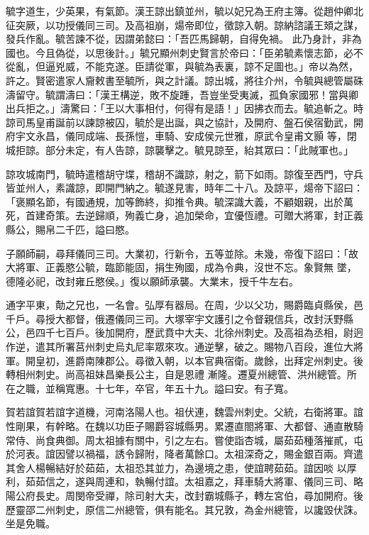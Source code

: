 \begin{pinyinscope}
 毓字道生，少英果，有氣節。漢王諒出鎮並州，毓以妃兄為王府主簿。從趙仲卿北征突厥，以功授儀同三司。及高祖崩，煬帝即位，徵諒入朝。諒納諮議王頍之謀，發兵作亂。毓苦諫不從，因謂弟懿曰：「吾匹馬歸朝，自得免禍。
 此乃身計，非為國也。今且偽從，以思後計。」毓兄顯州刺史賢言於帝曰：「臣弟毓素懷志節，必不從亂，但逼兇威，不能克遂。臣請從軍，與毓為表裏，諒不足圖也。」帝以為然，許之。賢密遣家人齎敕書至毓所，與之計議。諒出城，將往介州，令毓與總管屬硃濤留守。毓謂濤曰：「漢王構逆，敗不旋踵，吾豈坐受夷滅，孤負家國邪！當與卿出兵拒之。」濤驚曰：「王以大事相付，何得有是語！」因拂衣而去。毓追斬之。時諒司馬皇甫誕前以諫諒被囚，毓於是出誕，與之協計，及開府、盤石侯宿勤武，開府宇文永昌，儀同成端、長孫愷，車騎、安成侯元世雅，原武令皇甫文顥
 等，閉城拒諒。部分未定，有人告諒，諒襲擊之。毓見諒至，紿其眾曰：「此賊軍也。」



 諒攻城南門，毓時遣稽胡守堞，稽胡不識諒，射之，箭下如雨。諒復至西門，守兵皆並州人，素識諒，即開門納之。毓遂見害，時年二十八。及諒平，煬帝下詔曰：「褒顯名節，有國通規，加等飾終，抑推令典。毓深識大義，不顧姻親，出於萬死，首建奇策。去逆歸順，殉義亡身，追加榮命，宜優恆禮。可贈大將軍，封正義縣公，賜帛二千匹，謚曰愍。



 子願師嗣，尋拜儀同三司。大業初，行新令，五等並除。未幾，帝復下詔曰：「故大將軍、正義愍公毓，臨節能固，捐生殉國，成為令典，沒世不忘。象賢無
 墜，德隆必祀，改封雍丘愍侯。」復以願師承襲。大業末，授千牛左右。



 通字平東，勣之兄也，一名會。弘厚有器局。在周，少以父功，賜爵臨貞縣侯，邑千戶。尋授大都督，俄遷儀同三司。大塚宰宇文護引之令督親信兵，改封沃野縣公，邑四千七百戶。後加開府，歷武賁中大夫、北徐州刺史。及高祖為丞相，尉迥作逆，遣其所署莒州刺史烏丸尼率眾來攻。通逆擊，破之。賜物八百段，進位大將軍。開皇初，進爵南陳郡公。尋徵入朝，以本官典宿衛。歲餘，出拜定州刺史。後轉相州刺史。尚高祖妹昌樂長公主，自是恩禮
 漸隆。遷夏州總管、洪州總管。所在之職，並稱寬惠。十七年，卒官，年五十九。謚曰安。有子寬。



 賀若誼賀若誼字道機，河南洛陽人也。祖伏連，魏雲州刺史。父統，右衛將軍。誼性剛果，有幹略。在魏以功臣子賜爵容城縣男。累遷直閤將軍、大都督、通直散騎常侍、尚食典御。周太祖據有關中，引之左右。嘗使詣杏城，屬茹茹種落摧貳，屯於河表。誼因譬以禍福，誘令歸附，降者萬餘口。太祖深奇之，賜金銀百兩。齊遣其舍人楊暢結好於茹茹，太祖恐其並力，為邊境之患，使誼聘茹茹。誼因啖
 以厚利，茹茹信之，遂與周連和，執暢付誼。太祖嘉之，拜車騎大將軍、儀同三司、略陽公府長史。周閔帝受禪，除司射大夫，改封霸城縣子，轉左宮伯，尋加開府。後歷靈邵二州刺史，原信二州總管，俱有能名。其兄敦，為金州總管，以讒毀伏誅。坐是免職。




\end{pinyinscope}
